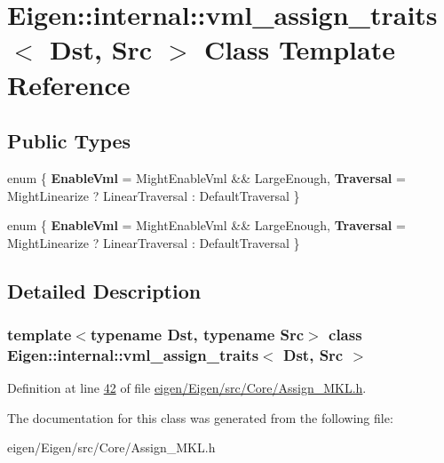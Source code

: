 \hypertarget{class_eigen_1_1internal_1_1vml__assign__traits}{}\section{Eigen\+:\+:internal\+:\+:vml\+\_\+assign\+\_\+traits$<$ Dst, Src $>$ Class Template Reference}
\label{class_eigen_1_1internal_1_1vml__assign__traits}
\subsection*{Public Types}
\begin{DoxyCompactItemize}
\item 
\mbox{\label{class_eigen_1_1internal_1_1vml__assign__traits_a0183635f55cf2ea19ea1790c340e29d6}} 
enum \{ {\bfseries Enable\+Vml} = Might\+Enable\+Vml \&\& Large\+Enough, 
{\bfseries Traversal} = Might\+Linearize ? Linear\+Traversal \+: Default\+Traversal
 \}
\item 
\mbox{\label{class_eigen_1_1internal_1_1vml__assign__traits_a60898c3d6953720f7f53e1363c11f4bb}} 
enum \{ {\bfseries Enable\+Vml} = Might\+Enable\+Vml \&\& Large\+Enough, 
{\bfseries Traversal} = Might\+Linearize ? Linear\+Traversal \+: Default\+Traversal
 \}
\end{DoxyCompactItemize}


\subsection{Detailed Description}
\subsubsection*{template$<$typename Dst, typename Src$>$\newline
class Eigen\+::internal\+::vml\+\_\+assign\+\_\+traits$<$ Dst, Src $>$}



Definition at line \hyperlink{eigen_2_eigen_2src_2_core_2_assign___m_k_l_8h_source_l00042}{42} of file \hyperlink{eigen_2_eigen_2src_2_core_2_assign___m_k_l_8h_source}{eigen/\+Eigen/src/\+Core/\+Assign\+\_\+\+M\+K\+L.\+h}.



The documentation for this class was generated from the following file\+:\begin{DoxyCompactItemize}
\item 
eigen/\+Eigen/src/\+Core/\+Assign\+\_\+\+M\+K\+L.\+h\end{DoxyCompactItemize}
